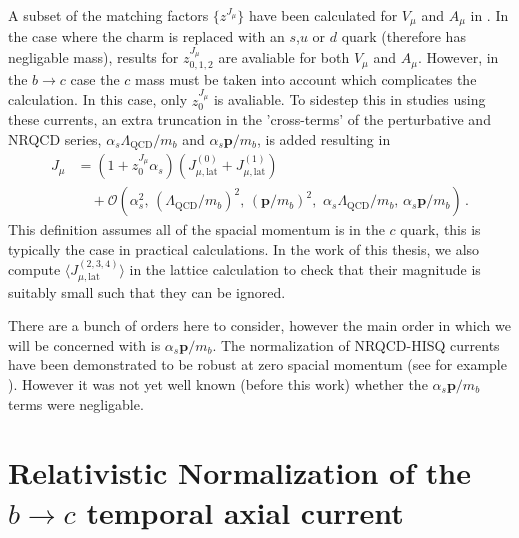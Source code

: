 A subset of the matching factors $\{z^{J_{\mu}}\}$ have been calculated for $V_{\mu}$ and $A_{\mu}$ in \cite{Monahan:2012dq}. In the case where the charm is replaced with an $s$,$u$ or $d$ quark (therefore has negligable mass), results for $z^{J_{\mu}}_{0,1,2}$ are avaliable for both $V_{\mu}$ and $A_{\mu}$. However, in the $b\to c$ case the $c$ mass must be taken into account which complicates the calculation. In this case, only $z^{J_{\mu}}_{0}$ is avaliable. To sidestep this in studies using these currents, an extra truncation in the 'cross-terms' of the perturbative and NRQCD series, $\alpha_s \Lambda_{\text{QCD}}/m_b$ and $\alpha_s {\textbf{p}}/m_b$, is added resulting in
\begin{align}
  \label{eq:nrqcd-hisq-current-truncate}
  J_{\mu} &= ( 1 + z^{J_{\mu}}_0 \alpha_s )( J_{\mu,\text{lat}}^{(0)} + J_{\mu,\text{lat}}^{(1)} ) \\ \nonumber &\quad + \mathcal{O}(\alpha_s^2,\, (\Lambda_{\text{QCD}}/m_b)^2,\, ({\textbf{p}}/m_b)^2,\,\, \alpha_s \Lambda_{\text{QCD}} / m_b, \, \alpha_s {\textbf{p}}/m_b )\,.
\end{align}
This definition assumes all of the spacial momentum is in the $c$ quark, this is typically the case in practical calculations. In the work of this thesis, we also compute $\langle J_{\mu,\text{lat}}^{(2,3,4)}\rangle$ in the lattice calculation to check that their magnitude is suitably small such that they can be ignored.

There are a bunch of orders here to consider, however the main order in which we will be concerned with is $\alpha_s{\textbf{p}}/m_b$. The normalization of NRQCD-HISQ currents have been demonstrated to be robust at zero spacial momentum (see for example \cite{Hughes:2017spc}). However it was not yet well known (before this work) whether the $\alpha_s{\textbf{p}}/m_b$ terms were negligable.

\section{Relativistic Normalization of the $b\to c$ temporal axial current}
\label{sec:relativistic}

